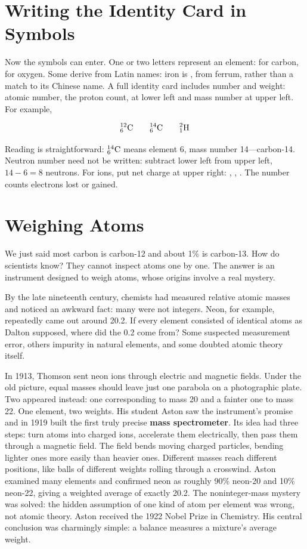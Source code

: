 \section{Writing the Identity Card in Symbols}

Now the symbols can enter. One or two letters represent an element:  for carbon,  for oxygen. Some derive from Latin names: iron is , from ferrum, rather than a match to its Chinese name. A full identity card includes number and weight: atomic number, the proton count, at lower left and mass number at upper left. For example,

\[{}^{12}_{6}\mathrm{C} \qquad {}^{14}_{6}\mathrm{C} \qquad {}^{2}_{1}\mathrm{H}\]

Reading is straightforward: ${}^{14}_{6}\mathrm{C}$ means element 6, mass number 14---carbon-14. Neutron number need not be written: subtract lower left from upper left, $14-6=8$ neutrons. For ions, put net charge at upper right: , , . The number counts electrons lost or gained.

\section{Weighing Atoms}

\begin{zhengju}
We just said most carbon is carbon-12 and about 1\% is carbon-13. How do scientists know? They cannot inspect atoms one by one. The answer is an instrument designed to weigh atoms, whose origins involve a real mystery.

By the late nineteenth century, chemists had measured relative atomic masses and noticed an awkward fact: many were not integers. Neon, for example, repeatedly came out around 20.2. If every element consisted of identical atoms as Dalton supposed, where did the 0.2 come from? Some suspected measurement error, others impurity in natural elements, and some doubted atomic theory itself.

In 1913, Thomson sent neon ions through electric and magnetic fields. Under the old picture, equal masses should leave just one parabola on a photographic plate. Two appeared instead: one corresponding to mass 20 and a fainter one to mass 22. One element, two weights. His student Aston saw the instrument's promise and in 1919 built the first truly precise \textbf{mass spectrometer}. Its idea had three steps: turn atoms into charged ions, accelerate them electrically, then pass them through a magnetic field. The field bends moving charged particles, bending lighter ones more easily than heavier ones. Different masses reach different positions, like balls of different weights rolling through a crosswind. Aston examined many elements and confirmed neon as roughly 90\% neon-20 and 10\% neon-22, giving a weighted average of exactly 20.2. The noninteger-mass mystery was solved: the hidden assumption of one kind of atom per element was wrong, not atomic theory. Aston received the 1922 Nobel Prize in Chemistry. His central conclusion was charmingly simple: a balance measures a mixture's average weight.
\end{zhengju}

